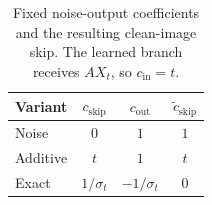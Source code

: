 \begin{table}[!htbp]
\centering
\caption{Fixed noise-output coefficients and the resulting clean-image skip. The learned branch receives $AX_t$, so $c_{\mathrm{in}}=t$.}
\label{tab:exp-coeff}
\small
\begin{tabular}{lccc}
\toprule
Variant & $c_{\mathrm{skip}}$ & $c_{\mathrm{out}}$ & $\tilde c_{\mathrm{skip}}$\\
\midrule
Noise & $0$ & $1$ & $1$\\
Additive & $t$ & $1$ & $t$\\
Exact & $1/\sigma_t$ & $-1/\sigma_t$ & $0$\\
\bottomrule
\end{tabular}
\end{table}
